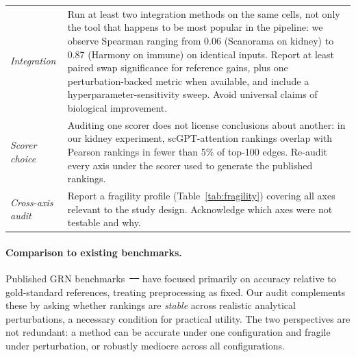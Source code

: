\documentclass[12pt]{article}
\providecommand{\DIFaddtex}[1]{{\protect\color{blue}\uwave{#1}}} %
\providecommand{\DIFdeltex}[1]{{\protect\color{red}\sout{#1}}}                      %
\providecommand{\DIFaddbegin}{} %
\providecommand{\DIFaddend}{} %
\providecommand{\DIFdelbegin}{} %
\providecommand{\DIFdelend}{} %
\providecommand{\DIFadd}[1]{\texorpdfstring{\DIFaddtex{#1}}{#1}} %
\providecommand{\DIFdel}[1]{\texorpdfstring{\DIFdeltex{#1}}{}} %
\begin{document}
\begin{table}[ht]
\begin{tabularx}{\textwidth}{lX}
\addlinespace
\textit{Integration} &
  Run at least two integration methods on the same cells, not only the
  tool that happens to be most popular in the pipeline: we observe
  Spearman ranging from 0.06 (Scanorama on kidney) to 0.87 (Harmony
  on immune) on identical inputs. Report at least paired swap
  significance for reference gains, plus one perturbation-backed
  metric when available, and include a hyperparameter-sensitivity
  sweep. Avoid universal claims of biological improvement. \\
\addlinespace
\textit{Scorer choice} &
  Auditing one scorer does not license conclusions about another: in
  our kidney experiment, scGPT-attention rankings overlap with Pearson
  rankings in fewer than 5\% of top-100 edges. Re-audit every axis
  under the scorer used to generate the published rankings. \\
\addlinespace
\textit{Cross-axis audit} &
  Report a fragility profile (Table~\ref{tab:fragility}) covering all
  axes relevant to the study design. Acknowledge which axes were not
  testable and why. \\
\bottomrule
\end{tabularx}
\end{table}
\DIFaddend 

\paragraph{Comparison to existing benchmarks.}
Published GRN benchmarks~\DIFdelbegin \DIFdel{\mbox{%
\citep{Pratapa2020, Chen2023} }\hskip0pt%
}\DIFdelend \DIFaddbegin \DIFadd{\mbox{%
\citep{Pratapa2020, Chen2018} }\hskip0pt%
}\DIFaddend have focused primarily on
accuracy relative to gold-standard references, treating preprocessing as fixed.
Our audit complements these by asking whether rankings are \emph{stable} across
realistic analytical perturbations, a necessary condition for practical utility.
The two perspectives are not redundant: a method can be accurate under one
configuration and fragile under perturbation, or robustly mediocre across all
configurations.
\end{document}
